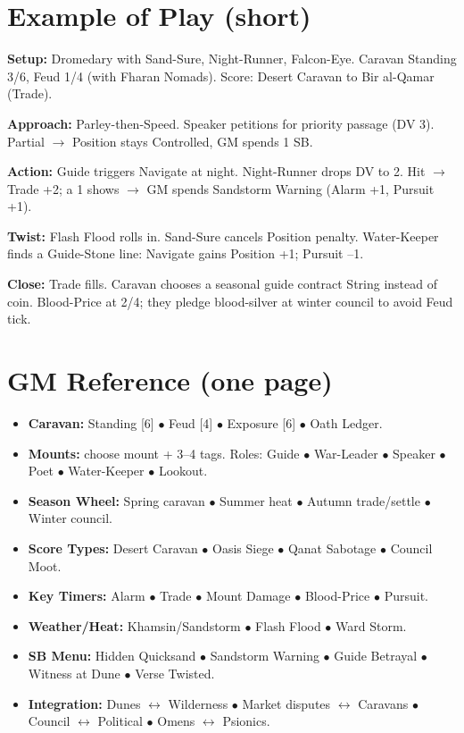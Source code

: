 \documentclass[11pt]{article}
\begin{document}
\section{Example of Play (short)}

\textbf{Setup:} Dromedary with Sand-Sure, Night-Runner, Falcon-Eye. Caravan Standing 3/6, Feud 1/4 (with Fharan Nomads). Score: Desert Caravan to Bir al-Qamar (Trade).

\textbf{Approach:} Parley-then-Speed. Speaker petitions for priority passage (DV 3). Partial $\rightarrow$ Position stays Controlled, GM spends 1 SB.

\textbf{Action:} Guide triggers Navigate at night. Night-Runner drops DV to 2. Hit $\rightarrow$ Trade +2; a 1 shows $\rightarrow$ GM spends Sandstorm Warning (Alarm +1, Pursuit +1).

\textbf{Twist:} Flash Flood rolls in. Sand-Sure cancels Position penalty. Water-Keeper finds a Guide-Stone line: Navigate gains Position +1; Pursuit --1.

\textbf{Close:} Trade fills. Caravan chooses a seasonal guide contract String instead of coin. Blood-Price at 2/4; they pledge blood-silver at winter council to avoid Feud tick.

\section{GM Reference (one page)}
\begin{itemize}
\item \textbf{Caravan:} Standing [6] $\bullet$ Feud [4] $\bullet$ Exposure [6] $\bullet$ Oath Ledger.
\item \textbf{Mounts:} choose mount + 3--4 tags. Roles: Guide $\bullet$ War-Leader $\bullet$ Speaker $\bullet$ Poet $\bullet$ Water-Keeper $\bullet$ Lookout.
\item \textbf{Season Wheel:} Spring caravan $\bullet$ Summer heat $\bullet$ Autumn trade/settle $\bullet$ Winter council.
\item \textbf{Score Types:} Desert Caravan $\bullet$ Oasis Siege $\bullet$ Qanat Sabotage $\bullet$ Council Moot.
\item \textbf{Key Timers:} Alarm $\bullet$ Trade $\bullet$ Mount Damage $\bullet$ Blood-Price $\bullet$ Pursuit.
\item \textbf{Weather/Heat:} Khamsin/Sandstorm $\bullet$ Flash Flood $\bullet$ Ward Storm.
\item \textbf{SB Menu:} Hidden Quicksand $\bullet$ Sandstorm Warning $\bullet$ Guide Betrayal $\bullet$ Witness at Dune $\bullet$ Verse Twisted.
\item \textbf{Integration:} Dunes $\leftrightarrow$ Wilderness $\bullet$ Market disputes $\leftrightarrow$ Caravans $\bullet$ Council $\leftrightarrow$ Political $\bullet$ Omens $\leftrightarrow$ Psionics.
\end{itemize}
\end{document}
